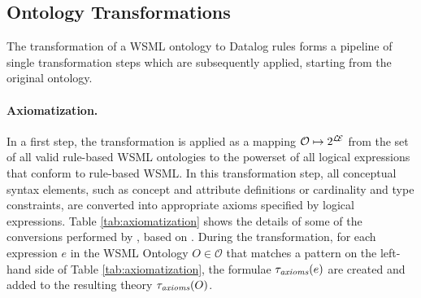 \def\mvexpr{\ensuremath{E}}
\def\mvex{\ensuremath{E_x}}
\def\mvey{\ensuremath{E_y}}
\def\mvez{\ensuremath{E_z}}
\def\mve1{\ensuremath{E_1}}
\def\mven{\ensuremath{E_n}}

\subsection{Ontology Transformations}
The transformation of a WSML ontology to Datalog rules forms a
pipeline of single transformation steps which are subsequently
applied, starting from the original ontology.

\paragraph{Axiomatization.} In a first step, the transformation
\transax is applied as a mapping $\mathcal{O} \mapsto 2^{\mathcal{L\!E}}$ from
the set of all valid rule-based WSML ontologies to the powerset of
all logical expressions that conform to rule-based WSML. In this
transformation step, all conceptual syntax elements, such as
concept and attribute definitions or cardinality and type
constraints, are converted into appropriate axioms specified by
logical expressions. Table \ref{tab:axiomatization} shows the
details of some of the conversions performed by \transax, based on
\cite{wsml-spec}. During the transformation, for each expression
$e$ in the WSML Ontology $O \in \mathcal{O}$ that matches a
pattern on the left-hand side of Table \ref{tab:axiomatization},
the formulae $\tau_{\textit{\scriptsize{axioms}}}(e)$ are created and added to the resulting
theory $\tau_{\textit{\scriptsize{axioms}}}(O)$.


